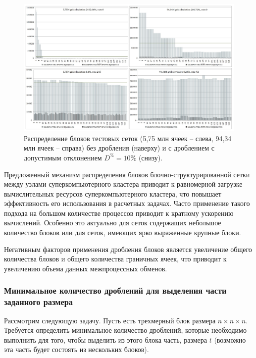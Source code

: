 \begin{figure}[ht]
\centering
\includegraphics[width=1.0\textwidth]{./pics/text_2_withcut/withcut-charts.pdf}
\singlespacing
{}\caption{Распределение блоков тестовых сеток (5,75 млн ячеек -- слева, 94,34 млн ячеек -- справа) без дробления (наверху) и с дроблением с допустимым отклонением $D^{\%} = 10\%$ (снизу).}
\label{fig:text_2_withcut_charts}
\end{figure}

Предложенный механизм распределения блоков блочно-структурированной сетки между узлами суперкомпьютерного кластера приводит к равномерной загрузке вычислительных ресурсов суперкомпьютерного кластера, что повышает эффективность его использования в расчетных задачах.
Часто применение такого подхода на большом количестве процессов приводит к кратному ускорению вычислений.
Особенно это актуально для сеток содержащих небольшое количество блоков или для сеток, имеющих ярко выраженные крупные блоки.

Негативным факторов применения дробления блоков является увеличение общего количества блоков и общего количества граничных ячеек, что приводит к увеличению объема данных межпроцессных обменов.

\subsubsection{Минимальное количество дроблений для выделения части заданного размера}

Рассмотрим следующую задачу.
Пусть есть трехмерный блок размера $n \times n \times n$.
Требуется определить минимальное количество дроблений, которые необходимо выполнить для того, чтобы выделить из этого блока часть, размера $t$ (возможно эта часть будет состоять из нескольких блоков).

